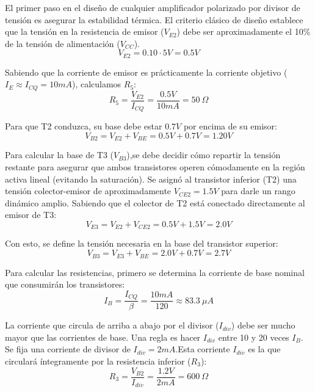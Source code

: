 \documentclass[11pt,a4paper,twoside]{report}
\begin{document}
	El primer paso en el diseño de cualquier amplificador polarizado por divisor de tensión es asegurar la estabilidad térmica. El criterio clásico de diseño establece que la tensión en la resistencia de emisor ($V_{E2}$) debe ser aproximadamente el 10\% de la tensión de alimentación ($V_{CC}$).
	\begin{equation}
		V_{E2} = 0.10 \cdot 5V = 0.5V
	\end{equation}
	
	Sabiendo que la corriente de emisor es prácticamente la corriente objetivo ($I_E \approx I_{CQ} = 10 mA$), calculamos $R_5$:
	\begin{equation}
		R_5 = \frac{V_{E2}}{I_{CQ}} = \frac{0.5V}{10mA} = 50 \ \Omega
	\end{equation}
	
	Para que T2 conduzca, su base debe estar $0.7V$ por encima de su emisor:
	\begin{equation}
		V_{B2} = V_{E2} + V_{BE} = 0.5V + 0.7V = 1.20V
	\end{equation}
	
	Para calcular la base de T3 ($V_{B3}$),se debe decidir cómo repartir la tensión restante para asegurar que ambos transistores operen cómodamente en la región activa lineal (evitando la saturación). Se asignó al transistor inferior (T2) una tensión colector-emisor de aproximadamente $V_{CE2} = 1.5V$ para darle un rango dinámico amplio. Sabiendo que el colector de T2 está conectado directamente al emisor de T3:
	\begin{equation}
		V_{E3} = V_{E2} + V_{CE2} = 0.5V + 1.5V = 2.0V
	\end{equation}
	
	Con esto, se define la tensión necesaria en la base del transistor superior:
	\begin{equation}
		V_{B3} = V_{E3} + V_{BE} = 2.0V + 0.7V = 2.7V
	\end{equation}
	
	Para calcular las resistencias, primero se determina la corriente de base nominal que consumirán los transistores:
	\begin{equation}
		I_B = \frac{I_{CQ}}{\beta} = \frac{10 mA}{120} \approx 83.3 \ \mu A
	\end{equation}
	
	La corriente que circula de arriba a abajo por el divisor ($I_{div}$) debe ser mucho mayor que las corrientes de base. Una regla es hacer $I_{div}$ entre 10 y 20 veces $I_B$. Se fija una corriente de divisor de $I_{div} = 2 mA$.Esta corriente $I_{div}$ es la que circulará íntegramente por la resistencia inferior ($R_3$):
	\begin{equation}
		R_3 = \frac{V_{B2}}{I_{div}} = \frac{1.2V}{2mA} = 600 \ \Omega
	\end{equation}
	
\end{document}
